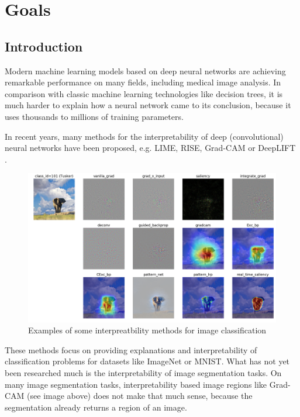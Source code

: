 \chapter{Goals}

\section{Introduction}
Modern machine learning models based on deep neural networks are achieving remarkable performance on many fields, including medical image analysis. In comparison
with classic machine learning technologies like decision trees, it is much harder to explain how a neural network came to its conclusion, because it uses thousands to millions of training parameters.

In recent years, many methods for the interpretability of deep (convolutional) neural networks have been proposed, e.g. LIME\cite{ribeiro2016should}, RISE\cite{Petsiuk2018rise}, Grad-CAM\cite{selvaraju2017grad} or DeepLIFT \cite{shrikumar2017learning}.

\begin{figure}[h]
\centering
\caption{Examples of some interpreatbility methods for image classification \cite{visualattribution}}
\includegraphics[width=14cm]{images/tusker_saliency.png}
\end{figure}

These methods focus on providing explanations and interpretability of classification problems for datasets like ImageNet or MNIST. What has not yet been researched much is the interpretability of image segmentation tasks. On many image segmentation tasks, interpretability based image regions like Grad-CAM (see image above) does not make that much sense, because the segmentation already returns a region of an image.

